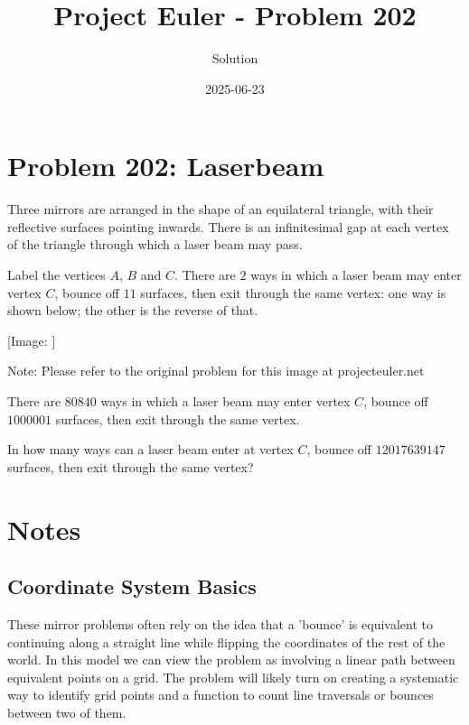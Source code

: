 \documentclass{article}
\title{Project Euler - Problem 202}
\author{Solution}
\date{2025-06-23}
\begin{document}
\maketitle

\section*{Problem 202: Laserbeam}


Three mirrors are arranged in the shape of an equilateral triangle, with their reflective surfaces pointing inwards. There is an infinitesimal gap at each vertex of the triangle through which a laser beam may pass.

\par
Label the vertices $A$, $B$ and $C$. There are $2$ ways in which a laser beam may enter vertex $C$, bounce off $11$ surfaces, then exit through the same vertex: one way is shown below; the other is the reverse of that.

\par
\begin{center}
[Image: ]

\par
Note: Please refer to the original problem for this image at projecteuler.net
\end{center}
There are $80840$ ways in which a laser beam may enter vertex $C$, bounce off $1000001$ surfaces, then exit through the same vertex.

\par
In how many ways can a laser beam enter at vertex $C$, bounce off $12017639147$ surfaces, then exit through the same vertex?

\par


\section*{Notes}

\subsection*{Coordinate System Basics}

These mirror problems often rely on the idea that a 'bounce' is equivalent to continuing along a straight line while flipping the coordinates of the rest of the world.  In this model we can view the problem as involving a linear path between equivalent points on a grid.  The problem will likely turn on creating a systematic way to identify grid points and a function to count line traversals or bounces between two of them.
\end{document}
